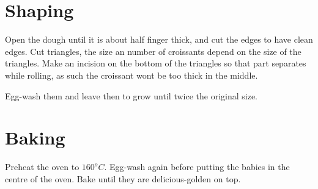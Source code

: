 \section{Shaping}
Open the dough until it is about half finger thick, and cut the edges to have clean edges.
%
Cut triangles, the size an number of croissants depend on the size of the triangles.
%
Make an incision on the bottom of the triangles so that part separates while rolling, as such the croissant wont be too thick in the middle.

Egg-wash them and leave then to grow until twice the original size.

\section{Baking}

Preheat the oven to $160^oC$.
% 
Egg-wash again before putting the babies in the centre of the oven.
%
Bake until they are delicious-golden on top.

